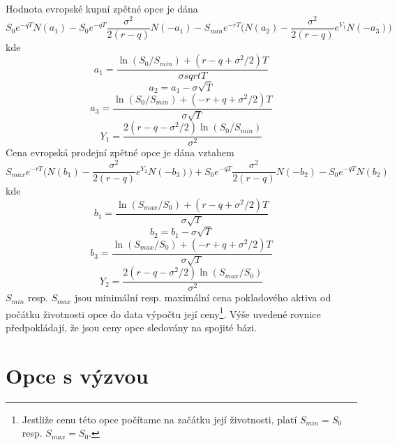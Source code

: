 \documentclass[a4paper]{book}
\begin{document}
Hodnota evropské kupní zpětné opce je dána
\begin{equation*}
S_0e^{-qT}N(a_1)-S_0e^{-qT}\frac{\sigma^2}{2(r-q)}N(-a_1)-S_{min}e^{-rT}\Bigg( N(a_2) - \frac{\sigma^2}{2(r-q)}e^{Y_1}N(-a_3)\Bigg)
\end{equation*}
kde
\begin{equation*}
a_1 = \frac{\ln(S_0/S_{min})+(r-q+\sigma^2/2)T}{\sigma sqrt{T}}
\end{equation*}
\begin{equation*}
a_2 = a_1 - \sigma \sqrt{T}
\end{equation*}
\begin{equation*}
a_3 = \frac{\ln(S_0/S_{min})+(-r+q+\sigma^2/2)T}{\sigma \sqrt{T}}
\end{equation*}
\begin{equation*}
Y_1 = \frac{2(r-q-\sigma^2/2)\ln(S_0/S_{min})}{\sigma^2}
\end{equation*}
Cena evropská prodejní zpětné opce je dána vztahem
\begin{equation*}
S_{max}e^{-rT}\Bigg( N(b_1) - \frac{\sigma^2}{2(r-q)}e^{Y_2}N(-b_3) \Bigg)+S_0e^{-qT} \frac{\sigma^2}{2(r-q)}N(-b_2)-S_0e^{-qT}N(b_2)
\end{equation*}
kde
\begin{equation*}
b_1 = \frac{\ln(S_{max}/S_0)+(r-q+\sigma^2/2)T}{\sigma \sqrt{T}}
\end{equation*}
\begin{equation*}
b_2 = b_1 - \sigma \sqrt{T}
\end{equation*}
\begin{equation*}
b_3 = \frac{\ln(S_{max}/S_0)+(-r+q+\sigma^2/2)T}{\sigma \sqrt{T}}
\end{equation*}
\begin{equation*}
Y_2 = \frac{2(r-q-\sigma^2/2)\ln(S_{max}/S_0)}{\sigma^2}
\end{equation*}
$S_{min}$ resp. $S_{max}$ jsou minimální resp. maximální cena pokladového aktiva od počátku životnosti opce do data výpočtu její ceny\footnote{Jestliže cenu této opce počítame na začátku její životnosti, platí $S_{min} = S_0$ resp. $S_{max}=S_0$.}. Výše uvedené rovnice předpokládají, že jsou ceny opce sledovány na spojité bázi.

\section{Opce s výzvou}
\end{document}
